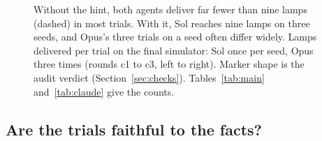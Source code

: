 \documentclass[10pt]{article}
\begin{document}
\begin{figure}[t]
  \caption{Without the hint, both agents deliver far fewer than nine lamps (dashed) in most trials. With it, Sol reaches nine lamps on three seeds, and Opus's three trials on a seed often differ widely. Lamps delivered per trial on the final simulator: Sol once per seed, Opus three times (rounds c1 to c3, left to right). Marker shape is the audit verdict (Section~\ref{sec:checks}). Tables~\ref{tab:main} and~\ref{tab:claude} give the counts.}
  \label{fig:results}
\end{figure}

\subsection{Are the trials faithful to the facts?}
\end{document}
